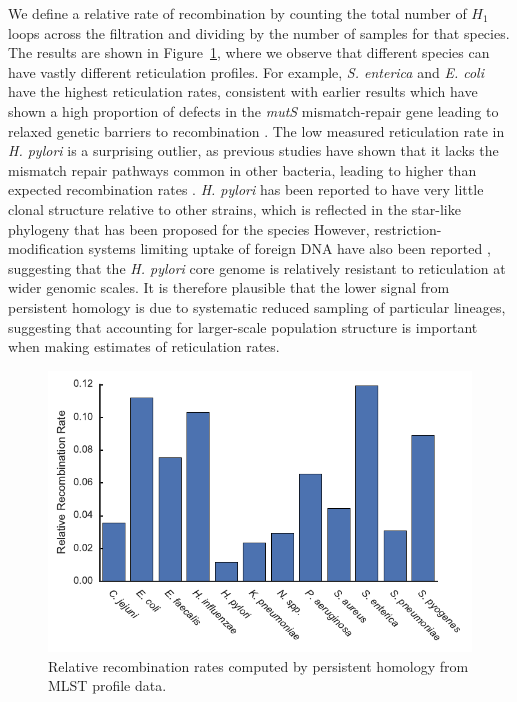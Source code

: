 We define a relative rate of recombination by counting the total number of $H_1$ loops across the filtration and dividing by the number of samples for that species.
The results are shown in Figure~\ref{fig:pathogen_barchart}, where we observe that different species can have vastly different reticulation profiles.
For example, \emph{S. enterica} and \emph{E. coli} have the highest reticulation rates, consistent with earlier results which have shown a high proportion of defects in the \emph{mutS} mismatch-repair gene leading to relaxed genetic barriers to recombination \cite{Rayssiguier:1989gb,LeClerc:1996hx}.
The low measured reticulation rate in \emph{H. pylori} is a surprising outlier, as previous studies have shown that it lacks the mismatch repair pathways common in other bacteria, leading to higher than expected recombination rates \cite{Dorer:2011hx}.
\emph{H. pylori} has been reported to have very little clonal structure relative to other strains, which is reflected in the star-like phylogeny that has been proposed for the species \cite{Kalia:2004jx}
However, restriction-modification systems limiting uptake of foreign DNA have also been reported \cite{Dwivedi:2013bt}, suggesting that the \emph{H. pylori} core genome is relatively resistant to reticulation at wider genomic scales.
It is therefore plausible that the lower signal from persistent homology is due to systematic reduced sampling of particular lineages, suggesting that accounting for larger-scale population structure is important when making estimates of reticulation rates.

\begin{figure}
\centering
\includegraphics[width=\textwidth]{./fig/pathogens/pathogen_barchart.pdf}
\caption[Core genome reticulation patterns in pathogenic bacteria from MLST profiles]{Relative recombination rates computed by persistent homology from MLST profile data.}
\label{fig:pathogen_barchart}
\end{figure}

